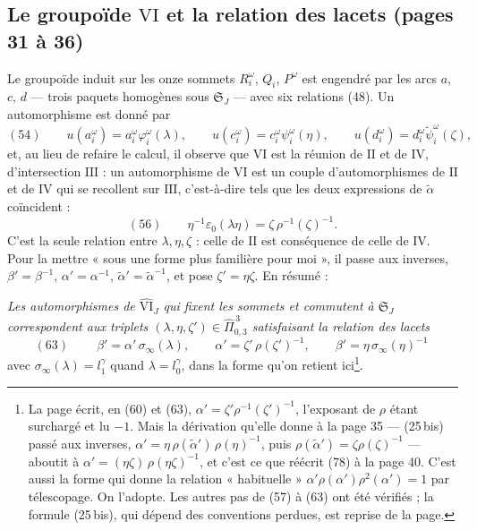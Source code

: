 \documentclass[11pt,a4paper]{article}
\begin{document}
\subsection*{Le groupoïde $\mathrm{VI}$ et la relation des lacets (pages 31 à 36)}

Le groupoïde induit sur les onze sommets $R_i^{\omega}$, $Q_i$, $P^{\omega}$
est engendré par les arcs $a$, $c$, $d$ — trois paquets homogènes sous
$\mathfrak{S}_J$ — avec six relations (48). Un automorphisme est donné par
\[
(54)\qquad u(a_i^{\omega}) = a_i^{\omega}\varphi_i^{\omega}(\lambda), \qquad
u(c_i^{\omega}) = c_i^{\omega}\psi_i^{\omega}(\eta), \qquad
u(d_i^{\omega}) = d_i^{\omega}\tilde\psi_i^{\omega}(\zeta),
\]
et, au lieu de refaire le calcul, il observe que $\mathrm{VI}$ est la réunion
de $\mathrm{II}$ et de $\mathrm{IV}$, d'intersection $\mathrm{III}$ : un
automorphisme de $\mathrm{VI}$ est un couple d'automorphismes de $\mathrm{II}$
et de $\mathrm{IV}$ qui se recollent sur $\mathrm{III}$, c'est-à-dire tels que
les deux expressions de $\tilde\alpha$ coïncident :
\[
(56)\qquad \eta^{-1}\varepsilon_0(\lambda\eta) = \zeta\, \rho^{-1}(\zeta)^{-1} .
\]
C'est la seule relation entre $\lambda, \eta, \zeta$ : celle de
$\mathrm{II}$ est conséquence de celle de $\mathrm{IV}$. Pour la mettre
« sous une forme plus familière pour moi », il passe aux inverses,
$\beta' = \beta^{-1}$, $\alpha' = \alpha^{-1}$, $\tilde\alpha' =
\tilde\alpha^{-1}$, et pose $\zeta' = \eta\zeta$. En résumé :

\emph{Les automorphismes de $\widehat{\mathrm{VI}}_J$ qui fixent les sommets et
commutent à $\mathfrak{S}_J$ correspondent aux triplets $(\lambda, \eta,
\zeta') \in \widehat\Pi_{0,3}^{\,3}$ satisfaisant la \emph{relation des
lacets}}
\[
(63)\qquad \boxed{\ \beta' = \alpha'\, \sigma_\infty(\lambda), \qquad \alpha' = \zeta'\, \rho(\zeta')^{-1}, \qquad \beta' = \eta\, \sigma_\infty(\eta)^{-1}\ }
\]
avec $\sigma_\infty(\lambda) = l_1^{\gamma}$ quand $\lambda =
l_0^{\gamma}$, dans la forme qu'on retient ici\footnote{La page écrit, en (60) et (63),
$\alpha' = \zeta'\rho^{-1}(\zeta')^{-1}$, l'exposant de $\rho$ étant surchargé
et lu $-1$. Mais la dérivation qu'elle donne à la page 35 — (25\,bis) passé
aux inverses, $\alpha' = \eta\,\rho(\tilde\alpha')\,\rho(\eta)^{-1}$, puis
$\rho(\tilde\alpha') = \zeta\rho(\zeta)^{-1}$ — aboutit à
$\alpha' = (\eta\zeta)\,\rho(\eta\zeta)^{-1}$, et c'est ce que réécrit (78) à
la page 40. C'est aussi la forme qui donne la relation « habituelle »
$\alpha'\rho(\alpha')\rho^2(\alpha') = 1$ par télescopage. On l'adopte. Les
autres pas de (57) à (63) ont été vérifiés ; la formule (25\,bis), qui dépend
des conventions perdues, est reprise de la page.}.
\end{document}
